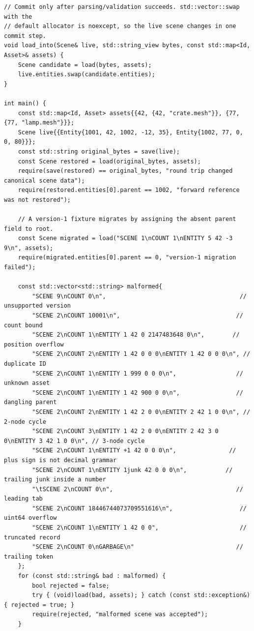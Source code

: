 \begin{verbatim}
// Commit only after parsing/validation succeeds. std::vector::swap with the
// default allocator is noexcept, so the live scene changes in one commit step.
void load_into(Scene& live, std::string_view bytes, const std::map<Id, Asset>& assets) {
    Scene candidate = load(bytes, assets);
    live.entities.swap(candidate.entities);
}

int main() {
    const std::map<Id, Asset> assets{{42, {42, "crate.mesh"}}, {77, {77, "lamp.mesh"}}};
    Scene live{{Entity{1001, 42, 1002, -12, 35}, Entity{1002, 77, 0, 0, 80}}};
    const std::string original_bytes = save(live);
    const Scene restored = load(original_bytes, assets);
    require(save(restored) == original_bytes, "round trip changed canonical scene data");
    require(restored.entities[0].parent == 1002, "forward reference was not restored");

    // A version-1 fixture migrates by assigning the absent parent field to root.
    const Scene migrated = load("SCENE 1\nCOUNT 1\nENTITY 5 42 -3 9\n", assets);
    require(migrated.entities[0].parent == 0, "version-1 migration failed");

    const std::vector<std::string> malformed{
        "SCENE 9\nCOUNT 0\n",                                      // unsupported version
        "SCENE 2\nCOUNT 10001\n",                                 // count bound
        "SCENE 2\nCOUNT 1\nENTITY 1 42 0 2147483648 0\n",        // position overflow
        "SCENE 2\nCOUNT 2\nENTITY 1 42 0 0 0\nENTITY 1 42 0 0 0\n", // duplicate ID
        "SCENE 2\nCOUNT 1\nENTITY 1 999 0 0 0\n",                 // unknown asset
        "SCENE 2\nCOUNT 1\nENTITY 1 42 900 0 0\n",                // dangling parent
        "SCENE 2\nCOUNT 2\nENTITY 1 42 2 0 0\nENTITY 2 42 1 0 0\n", // 2-node cycle
        "SCENE 2\nCOUNT 3\nENTITY 1 42 2 0 0\nENTITY 2 42 3 0 0\nENTITY 3 42 1 0 0\n", // 3-node cycle
        "SCENE 2\nCOUNT 1\nENTITY +1 42 0 0 0\n",               // plus sign is not decimal grammar
        "SCENE 2\nCOUNT 1\nENTITY 1junk 42 0 0 0\n",           // trailing junk inside a number
        "\tSCENE 2\nCOUNT 0\n",                                   // leading tab
        "SCENE 2\nCOUNT 18446744073709551616\n",                   // uint64 overflow
        "SCENE 2\nCOUNT 1\nENTITY 1 42 0 0",                       // truncated record
        "SCENE 2\nCOUNT 0\nGARBAGE\n"                             // trailing token
    };
    for (const std::string& bad : malformed) {
        bool rejected = false;
        try { (void)load(bad, assets); } catch (const std::exception&) { rejected = true; }
        require(rejected, "malformed scene was accepted");
    }


\end{verbatim}
